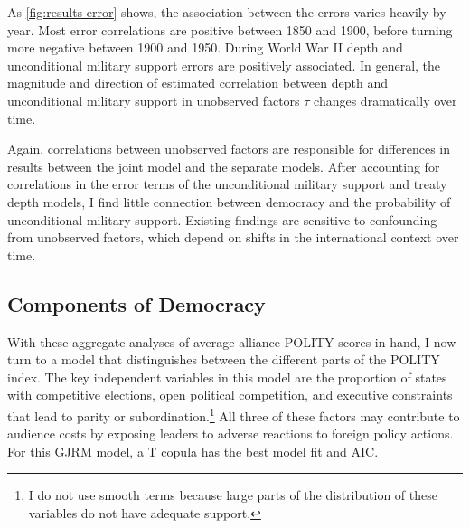 \documentclass[12pt]{article}
\begin{document}
As \autoref{fig:results-error} shows, the association between the errors varies heavily by year. 
Most error correlations are positive between 1850 and 1900, before turning more negative between 1900 and 1950. 
During World War II depth and unconditional military support errors are positively associated. 
In general, the magnitude and direction of estimated correlation between depth and unconditional military support in unobserved factors $\tau$ changes dramatically over time.  


Again, correlations between unobserved factors are responsible for differences in results between the joint model and the separate models. 
After accounting for correlations in the error terms of the unconditional military support and treaty depth models, I find little connection between democracy and the probability of unconditional military support. 
Existing findings are sensitive to confounding from unobserved factors, which depend on shifts in the international context over time. 


\subsection{Components of Democracy}

With these aggregate analyses of average alliance POLITY scores in hand, I now turn to a model that distinguishes between the different parts of the POLITY index. 
The key independent variables in this model are the proportion of states with competitive elections, open political competition, and executive constraints that lead to parity or subordination.\footnote{I do not use smooth terms because large parts of the distribution of these variables do not have adequate support.}
All three of these factors may contribute to audience costs by exposing leaders to adverse reactions to foreign policy actions. 
For this GJRM model, a T copula has the best model fit and AIC. 
\end{document}
